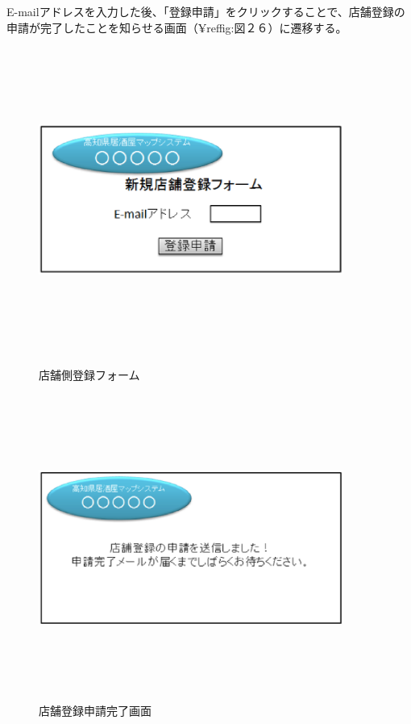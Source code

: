 \documentclass[a4j,titlepage]{jarticle}
\begin{document}
E-mailアドレスを入力した後、「登録申請」をクリックすることで、店舗登録の申請が完了したことを知らせる画面（¥ref{fig:図２６}）に遷移する。



\begin {figure}[!htbp]
    \begin{center}
    \includegraphics [height=10cm, width=10cm]{25.eps}
　　    \caption {店舗側登録フォーム}
    \label {fig:25}
    \end{center}
\end {figure}



\begin {figure}[!htbp]
    \begin{center}
    \includegraphics [height=10cm, width=10cm]{26.eps}
    \caption {店舗登録申請完了画面}
    \label {fig:26}
    \end{center}
\end {figure}
\end{document}
